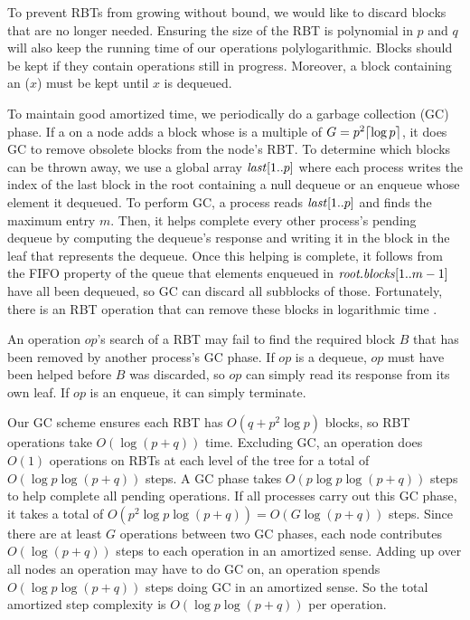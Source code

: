 To prevent RBTs from growing without bound, we would like to discard
blocks that are no longer needed.
Ensuring the size of the RBT is polynomial in $p$ and $q$ will 
also keep the running time of our operations polylogarithmic.
Blocks should be kept if they contain operations still in progress.
Moreover, a block containing an ($x$) must be kept until $x$ is dequeued.

To maintain good amortized time, we periodically do a garbage collection (GC) phase.
If a  on a node adds a block whose  is a multiple of $G=p^2\lceil \log p \rceil$, it does GC to remove obsolete blocks from the node's RBT.
To determine which blocks can be thrown away, we use a global array $\mbox{\textnormal{\textit{last}}}[1..p]$ where 
each process writes the index of the last block in the root
containing a null dequeue or an enqueue whose element it dequeued.
To perform GC, a process reads $\mbox{\textnormal{\textit{last}}}[1..p]$ and finds the maximum entry $m$.
Then, it helps complete every other process's pending dequeue 
by computing the dequeue's response and writing it in the block in the leaf that represents the dequeue.
Once this helping is complete, it follows from the FIFO property of the queue that elements enqueued 
in $\mbox{\textit{root.blocks}}[1..m-1]$ have all been dequeued, so GC can discard all subblocks of those.
Fortunately, there is an  RBT  operation that can remove
these blocks in logarithmic time \cite[Sec.~4.2]{Tar83}.

An operation $op$'s search of a RBT may fail to find the required block $B$ that has been removed 
by another process's GC phase.  If $op$
is a dequeue, $op$ must have been helped before $B$ was discarded, so $op$ can simply read its response from
its own leaf.  If $op$ is an enqueue, it can simply terminate.

Our GC scheme ensures each RBT has  $O(q+p^2\log p)$ blocks, so RBT operations take $O(\log(p+q))$ time.
Excluding GC, an operation does $O(1)$ operations on RBTs at each level of the tree for a total of
$O(\log p\log(p + q))$ steps.
A GC phase takes $O(p\log p \log(p+q))$ steps to help complete all pending operations.
If all processes carry out this GC phase, it takes a total of $O(p^2\log p\log(p+q))=O(G\log(p+q))$ steps.
Since there are at least $G$ operations between two GC phases, each node contributes $O(\log(p+q))$ steps to each operation in an amortized sense.
Adding up over all nodes an operation may have to do GC on, 
an operation spends $O(\log p\log(p+q))$ steps doing GC in an amortized sense.
So the total amortized step complexity is  $O(\log p \log(p+q))$ per operation.


